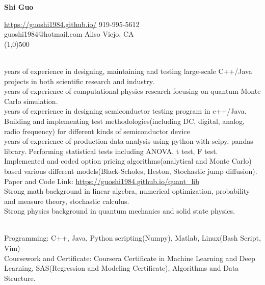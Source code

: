 \documentclass[11pt]{article} %
\begin{document}
 \centerline{\Large \bf Shi Guo}
  \noindent \url{https://guoshi1984.github.io/} \hspace{80mm}  919-995-5612\\
    guoshi1984@hotmail.com \hspace{95mm}   Aliso Viejo, CA\\
\line(1,0){500}


\vspace{1mm}

\\
 years of experience in designing, maintaining and testing large-scale C++/Java projects in both scientific research and industry.  \\
 years of experience of computational physics research focusing on quantum Monte Carlo simulation.\\
 years of experience in designing semiconductor testing program in c++/Java. Building and implementing test methodologies(including DC, digital, analog, radio frequency) for different kinds of semiconductor device \\
 years of experience of production data analysis using python with scipy, pandas library. 
Performing statistical tests including ANOVA, t test, F test. \\
 Implemented and coded option pricing algorithms(analytical and Monte Carlo) based various different models(Black-Scholes, Heston, Stochastic jump diffusion). Paper and Code Link:  \url{https://guoshi1984.github.io/quant_lib} \\
\noindent Strong math background in linear algebra, numerical optimization, probability and measure theory, stochastic calculus.  \\
\noindent Strong physics background in quantum mechanics and solid state physics.

\vspace{2mm}

\\
\noindent 
Programming: C++, Java, Python scripting(Numpy), Matlab,  Linux(Bash Script, Vim) \\
Coursework and Certificate: Coursera Certificate in Machine Learning and Deep Learning, SAS(Regression and Modeling Certificate), Algorithms and Data Structure. %



\vspace{2mm}
\end{document}
